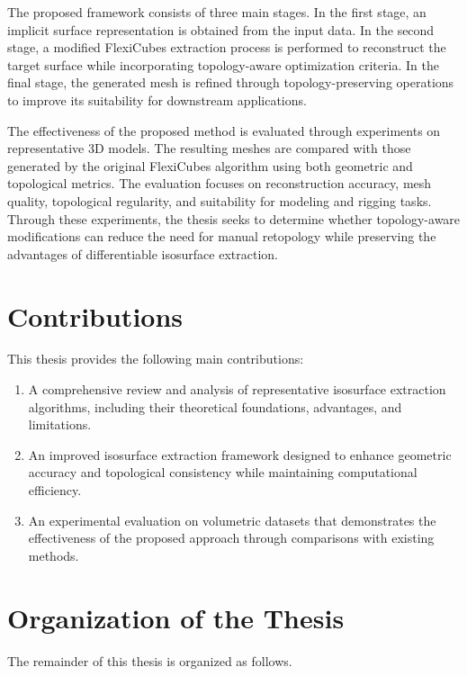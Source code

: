 \documentclass[../main.tex]{subfiles}
\begin{document}
The proposed framework consists of three main stages. In the first stage, an implicit surface representation is obtained from the input data. In the second stage, a modified FlexiCubes extraction process is performed to reconstruct the target surface while incorporating topology-aware optimization criteria. In the final stage, the generated mesh is refined through topology-preserving operations to improve its suitability for downstream applications.

The effectiveness of the proposed method is evaluated through experiments on representative 3D models. The resulting meshes are compared with those generated by the original FlexiCubes algorithm using both geometric and topological metrics. The evaluation focuses on reconstruction accuracy, mesh quality, topological regularity, and suitability for modeling and rigging tasks. Through these experiments, the thesis seeks to determine whether topology-aware modifications can reduce the need for manual retopology while preserving the advantages of differentiable isosurface extraction.


\section{Contributions}

This thesis provides the following main contributions:

\begin{enumerate}
	\item A comprehensive review and analysis of representative isosurface extraction algorithms, including their theoretical foundations, advantages, and limitations.
	
	\item An improved isosurface extraction framework designed to enhance geometric accuracy and topological consistency while maintaining computational efficiency.
	
	\item An experimental evaluation on volumetric datasets that demonstrates the effectiveness of the proposed approach through comparisons with existing methods.
\end{enumerate}

\section{Organization of the Thesis}

The remainder of this thesis is organized as follows.
\end{document}
